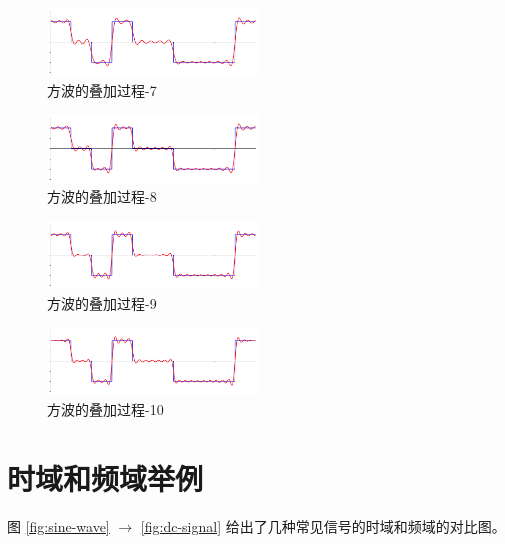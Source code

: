 \documentclass[lang=cn,newtx,10pt,scheme=chinese]{elegantbook}
\begin{document}
\begin{figure}[!htb]
\centering
\includegraphics[width=0.5\textwidth]{fourier_series_arbitrary_function-6.png}
\caption{方波的叠加过程-7}
\label{fig:fourier_series_arbitrary_function-6}
\end{figure}

\begin{figure}[!htb]
\centering
\includegraphics[width=0.5\textwidth]{fourier_series_arbitrary_function-7.png}
\caption{方波的叠加过程-8}
\label{fig:fourier_series_arbitrary_function-7}
\end{figure}

\begin{figure}[!htb]
\centering
\includegraphics[width=0.5\textwidth]{fourier_series_arbitrary_function-8.png}
\caption{方波的叠加过程-9}
\label{fig:fourier_series_arbitrary_function-8}
\end{figure}

\begin{figure}[!htb]
\centering
\includegraphics[width=0.5\textwidth]{fourier_series_arbitrary_function-9.png}
\caption{方波的叠加过程-10}
\label{fig:fourier_series_arbitrary_function-9}
\end{figure}

\section{时域和频域举例}

图 \ref{fig:sine-wave} $\rightarrow$ \ref{fig:dc-signal} 给出了几种常见信号的时域和频域的对比图。
\end{document}
